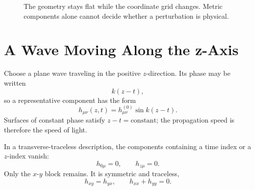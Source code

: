 \begin{figure}[htbp]
\centering
{}
\caption{The geometry stays flat while the coordinate grid changes. Metric
components alone cannot decide whether a perturbation is physical.}
\end{figure}

\section{A Wave Moving Along the z-Axis}

Choose a plane wave traveling in the positive \(z\)-direction. Its phase may
be written
\begin{equation}
 k(z-t),
\end{equation}
so a representative component has the form
\begin{equation}
 h_{\mu\nu}(z,t)
 =h_{\mu\nu}^{(0)}\sin k(z-t).
 \label{eq:plane-wave}
\end{equation}
Surfaces of constant phase satisfy \(z-t=\text{constant}\); the propagation
speed is therefore the speed of light.

In a transverse-traceless description, the components containing a time
index or a \(z\)-index vanish:
\begin{equation}
 h_{0\mu}=0,
 \qquad
 h_{z\mu}=0.
 \label{eq:tt-transverse}
\end{equation}
Only the \(x\)-\(y\) block remains. It is symmetric and traceless,
\begin{equation}
 h_{xy}=h_{yx},
 \qquad
 h_{xx}+h_{yy}=0.
 \label{eq:tt-trace}
\end{equation}


